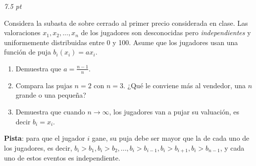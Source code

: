 \documentclass[12pt]{scrartcl} %
\begin{document}
\begin{Exercise}[title={Subasta de sobre cerrado con $n$ jugadores},name={Pregunta}]
\textit{7.5 pt}

  Considera la subasta de sobre cerrado al primer precio considerada en clase. Las valoraciones $x_1, x_2,...,x_n$ de los jugadores son desconocidas pero \textit{independientes} y uniformemente distribuidas entre 0 y 100. Asume que los jugadores usan una función de puja $b_i(x_i)=ax_i$.
  
  \begin{enumerate}
      \item Demuestra que $a=\frac{n-1}{n}$.
      \item Compara las pujas $n=2$ con $n=3$. ¿Qué le conviene más al vendedor, una $n$ grande o una pequeña?
      \item Demuestra que cuando $n \rightarrow \infty$, los jugadores van a pujar su valuación, es decir $b_i = x_i$.
  \end{enumerate}
  
  \textbf{Pista}: para que el jugador $ i $ gane, su puja debe ser mayor que la de cada uno de los jugadores, es decir, $ b_i > b_1, b_i > b_2, ..., b_i > b_{i-1}, b_i > b_{i+1}, b_i > b_{n-1} $, y cada uno de estos eventos es independiente. %

  
  
  \end{Exercise}
\end{document}
